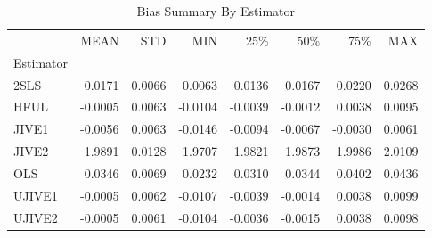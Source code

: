 \begin{table}[ht]
\centering
\caption{Bias Summary By Estimator}
\begin{tabular}{lrrrrrrr}
\toprule
 & MEAN & STD & MIN & 25\% & 50\% & 75\% & MAX \\
Estimator &  &  &  &  &  &  &  \\
\midrule
2SLS & 0.0171 & 0.0066 & 0.0063 & 0.0136 & 0.0167 & 0.0220 & 0.0268 \\
HFUL & -0.0005 & 0.0063 & -0.0104 & -0.0039 & -0.0012 & 0.0038 & 0.0095 \\
JIVE1 & -0.0056 & 0.0063 & -0.0146 & -0.0094 & -0.0067 & -0.0030 & 0.0061 \\
JIVE2 & 1.9891 & 0.0128 & 1.9707 & 1.9821 & 1.9873 & 1.9986 & 2.0109 \\
OLS & 0.0346 & 0.0069 & 0.0232 & 0.0310 & 0.0344 & 0.0402 & 0.0436 \\
UJIVE1 & -0.0005 & 0.0062 & -0.0107 & -0.0039 & -0.0014 & 0.0038 & 0.0099 \\
UJIVE2 & -0.0005 & 0.0061 & -0.0104 & -0.0036 & -0.0015 & 0.0038 & 0.0098 \\
\bottomrule
\end{tabular}
\end{table}
